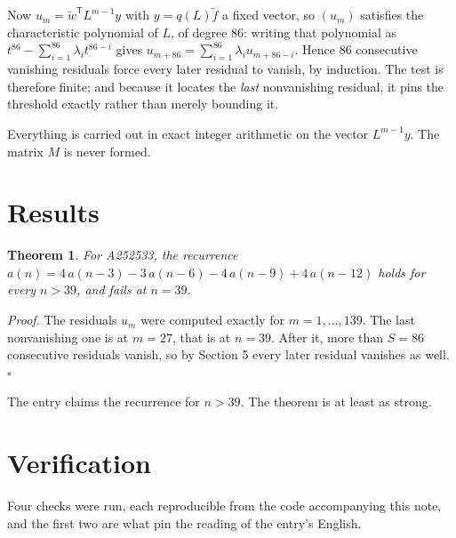 \documentclass[11pt]{article}
\newtheorem{theorem}{Theorem}
\theoremstyle{definition}
\begin{document}
Now $u_m = \tilde w^{\mathsf T} L^{m-1} y$ with $y = q(L)\tilde f$ a fixed vector, so $(u_m)$ satisfies the characteristic polynomial of $L$, of degree $86$: writing that polynomial as $t^{86} - \sum_{i=1}^{86} \lambda_i t^{86-i}$ gives $u_{m+86} = \sum_{i=1}^{86} \lambda_i u_{m+86-i}$. Hence $86$ consecutive vanishing residuals force every later residual to vanish, by induction. The test is therefore finite; and because it locates the {\itshape last} nonvanishing residual, it pins the threshold exactly rather than merely bounding it.

Everything is carried out in exact integer arithmetic on the vector $L^{m-1}y$. The matrix $M$ is never formed.

\section{Results}

\begin{theorem} For A252533, the recurrence $a(n) = 4\,a(n-3) - 3\,a(n-6) - 4\,a(n-9) + 4\,a(n-12)$ holds for every $n > 39$, and fails at $n = 39$.\end{theorem}

{\itshape Proof.} The residuals $u_m$ were computed exactly for $m = 1,\dots,139$. The last nonvanishing one is at $m = 27$, that is at $n = 39$. After it, more than $S = 86$ consecutive residuals vanish, so by Section 5 every later residual vanishes as well. $\square$

The entry claims the recurrence for $n > 39$. The theorem is at least as strong.

\section{Verification}

Four checks were run, each reproducible from the code accompanying this note, and the first two are what pin the reading of the entry's English.
\end{document}
